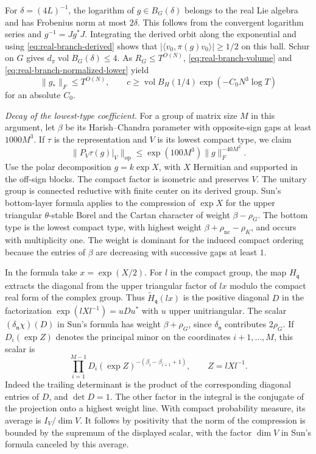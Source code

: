 For \(\delta=(4L)^{-1}\), the logarithm of \(g\in B_G(\delta)\)
belongs to the real Lie algebra and has Frobenius norm at most
\(2\delta\). This follows from the convergent logarithm series and
\(g^{-1}=Jg^*J\). Integrating the derived orbit along the exponential
and using \eqref{eq:real-branch-derived} shows that
\(|\langle v_0,\pi(g)v_0\rangle|\ge 1/2\) on this ball. Schur on
\(G\) gives \(d_\pi\operatorname{vol}B_G(\delta)\le 4\).
As \(R_G\le T^{O(N)}\), \eqref{eq:real-branch-volume} and
\eqref{eq:real-branch-normalized-lower} yield
\begin{equation}
 \|g_*\|_F\le T^{O(N)},\qquad
 c\ge \operatorname{vol}B_H(1/4)\exp(-C_0N^3\log T)
 \label{eq:real-branch-local-scale}
\end{equation}
for an absolute \(C_0\).

\emph{Decay of the lowest-type coefficient.}
For a group of matrix size \(M\) in this argument, let \(\beta\) be its
Harish--Chandra parameter with opposite-sign gaps at least
\(1000M^3\). If \(\tau\) is the representation and \(V\) is its
lowest compact type, we claim
\begin{equation}
 \|P_V\tau(g)|_V\|_{\mathrm{op}}
  \le \exp(100M^3)\|g\|_F^{-40M^2} .
 \label{eq:real-branch-lowest-decay}
\end{equation}
Use the polar decomposition \(g=k\exp X\), with \(X\) Hermitian
and supported in the off-sign blocks. The compact factor is
isometric and preserves \(V\). The unitary group is connected
reductive with finite center on its derived group. Sun's bottom-layer
formula applies to the compression of \(\exp X\) for the upper
triangular \(\theta\)-stable Borel and the Cartan character of weight
\(\beta-\rho_G\). The bottom type is the lowest compact type, with
highest weight \(\beta+\rho_{\mathrm{nc}}-\rho_K\), and occurs with
multiplicity one. The weight is dominant for the induced compact
ordering because the entries of \(\beta\) are decreasing with
successive gaps at least \(1\).
\cite[Theorem~6.3 and (25)--(26)]{real-branch-sun}

In the formula take \(x=\exp(X/2)\). For \(l\) in the compact
group, the map \(H_{\mathfrak q}\) extracts the diagonal from the
upper triangular factor of \(l x\) modulo the compact real form
of the complex group. Thus \(\widetilde H_{\mathfrak q}(l x)\) is
the positive diagonal \(D\) in the factorization
\(\exp(l X l^{-1})=u D u^*\) with \(u\) upper unitriangular.
The scalar \((\delta_{\mathfrak n}\chi)(D)\) in Sun's formula has
weight \(\beta+\rho_G\), since \(\delta_{\mathfrak n}\) contributes
\(2\rho_G\). If \(D_i(\exp Z)\) denotes the principal minor on the
coordinates \(i+1,\ldots,M\), this scalar is
\[
 \prod_{i=1}^{M-1}D_i(\exp Z)^{-(\beta_i-\beta_{i+1}+1)},
 \qquad Z=l X l^{-1}.
\]
Indeed the trailing determinant is the product of the corresponding
diagonal entries of \(D\), and \(\det D=1\). The other factor in
the integral is the conjugate of the projection onto a highest
weight line. With compact probability measure, its average is
\(I_V/\dim V\). It follows by positivity that the norm of the
compression is bounded by the supremum of the displayed scalar,
with the factor \(\dim V\) in Sun's formula canceled by this
average.

